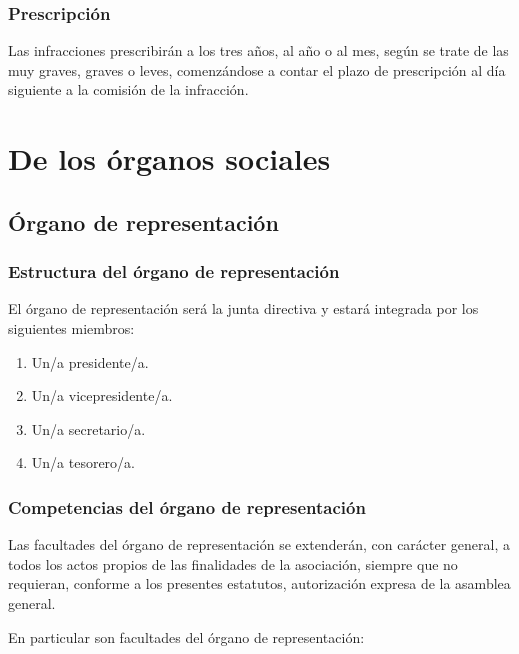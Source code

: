 \documentclass[a4paper, 12pt, oneside]{book}
\begin{document}
\subsection{Prescripción}

Las infracciones prescribirán a los tres años, al año o al mes, según se trate de las muy graves, graves o leves, comenzándose a contar el plazo de prescripción al día siguiente a la comisión de la infracción.

\chapter{De los órganos sociales}

\section{Órgano de representación}

\subsection{Estructura del órgano de representación}

El órgano de representación será la junta directiva y estará integrada por los siguientes miembros:

\begin{enumerate}
    \item Un/a presidente/a.  
    \item Un/a vicepresidente/a.  
    \item Un/a secretario/a.  
    \item Un/a tesorero/a.  
\end{enumerate}

\subsection{Competencias del órgano de representación}

Las facultades del órgano de representación se extenderán, con carácter general, a todos los actos propios de las finalidades de la asociación, siempre que no requieran, conforme a los presentes estatutos, autorización expresa de la asamblea general.

En particular son facultades del órgano de representación:
\end{document}
